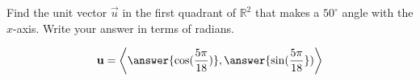 \documentclass{ximera}
\author{Gregory Hartman \and Matthew Carr}
\begin{document}
\begin{exercise}




Find the unit vector $\vec{u}$ in the first quadrant of $\mathbb{R}^2$ that makes a $50^{\circ}$ angle with the $x$-axis. Write your answer in terms of radians.

\begin{prompt}
\[
\vec{u}=\vector{\answer{\cos(\frac{5\pi}{18})},\answer{\sin(\frac{5\pi}{18}})}
\]
\end{prompt}

\end{exercise}
\end{document}
